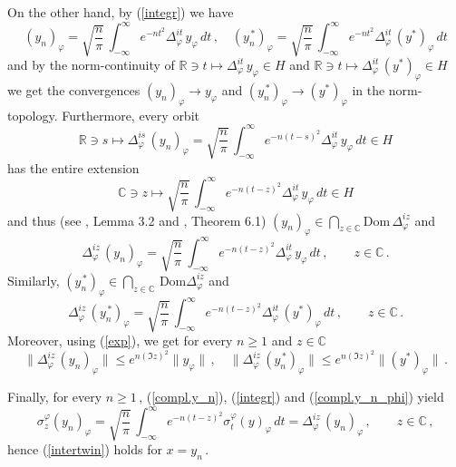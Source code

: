 \documentclass[reqno]{amsart}
\theoremstyle{definition}
\theoremstyle{remark}
\numberwithin{equation}{section}
\theoremstyle{plain}
\begin{document}
On the other hand, by (\ref{integr}) we have
\begin{equation*}
(y_n)_\varphi =\sqrt{\frac n\pi}\,\int_{-\infty}^\infty
e^{-n t^2}\Delta_\varphi^{i t}\, y_\varphi\, dt\, ,\quad
(y_n^{\, *})_\varphi =\sqrt{\frac n\pi}\,\int_{-\infty}^\infty
e^{-n t^2}\Delta_\varphi^{i t}\, (y^*)_\varphi\, dt
\end{equation*}
and by the norm-continuity of $\mathbb R\ni t\longmapsto
\Delta_\varphi^{i t}\, y_\varphi\in H$ and $\mathbb R\ni t
\longmapsto\Delta_\varphi^{i t}\, (y^*)_\varphi\in H$ we get
the convergences $(y_n)_\varphi\longrightarrow y_\varphi$ and
$(y_n^{\, *})_\varphi\longrightarrow (y^*)_\varphi$ in the
norm-topology. Furthermore, every orbit
\begin{equation*}
\mathbb R\ni s\longmapsto \Delta_\varphi^{i s}\, (y_n)_\varphi
=\sqrt{\frac n\pi}\,\int_{-\infty}^\infty e^{-n (t-s)^2}
\Delta_\varphi^{i t}\, y_\varphi\, dt\in H
\end{equation*}
has the entire extension
\begin{equation*}
\mathbb C\ni z\longmapsto
\sqrt{\frac n\pi}\, \int_{-\infty}^\infty e^{-n (t-z)^2}
\Delta_\varphi^{i t}\, y_\varphi\, dt\in H
\end{equation*}
and thus (see \cite{P-T}, Lemma 3.2 and \cite{C-Z}, Theorem 6.1)
$\displaystyle (y_n)_\varphi\in\bigcap_{z\in\mathbb C}
\text{Dom}\,\Delta_\varphi^{i z}$ and
\begin{equation}\label{compl.y_n_phi}
\Delta_\varphi^{i z}\, (y_n)_\varphi =\sqrt{\frac n\pi}\,
\int_{-\infty}^\infty e^{-n (t-z)^2} \Delta_\varphi^{i t}\,
y_\varphi\, dt\, ,\qquad z\in\mathbb C\, .
\end{equation}
Similarly, $\displaystyle (y_n^{\, *})_\varphi\in
\bigcap_{z\in\mathbb C}\,\text{Dom} \Delta_\varphi^{i z}$ and
\begin{equation*}
\Delta_\varphi^{i z}\, (y_n^{\, *})_\varphi =\sqrt{\frac n\pi}\,
\int_{-\infty}^\infty e^{-n (t-z)^2} \Delta_\varphi^{i t}\,
(y^*)_\varphi\, dt\, ,\qquad z\in\mathbb C\, .
\end{equation*}
Moreover, using (\ref{exp}), we get for every $n\geq 1$ and $z\in
\mathbb C$
\begin{equation*}
\| \Delta_\varphi^{i z}\, (y_n)_\varphi\|\leq e^{n (\Im z)^2}
\| y_\varphi\|\, ,\quad \| \Delta_\varphi^{i z}\,
(y_n^{\, *})_\varphi\|\leq e^{n (\Im z)^2}\| (y^*)_\varphi\|
\, .
\end{equation*}

Finally, for every $n\geq 1\,$, (\ref{compl.y_n}), (\ref{integr})
and (\ref{compl.y_n_phi}) yield
\begin{equation}\label{intertwiny_n}
\sigma^\varphi_z (y_n)_\varphi =\sqrt{\frac n\pi}\,
\int_{-\infty}^\infty e^{-n (t-z)^2} \sigma^\varphi_t (y)_\varphi
\, dt =\Delta_\varphi^{i z}\, (y_n)_\varphi\, ,\qquad z\in
\mathbb C\, ,
\end {equation}
hence (\ref{intertwin}) holds for $x=y_n\,$.
\end{document}
